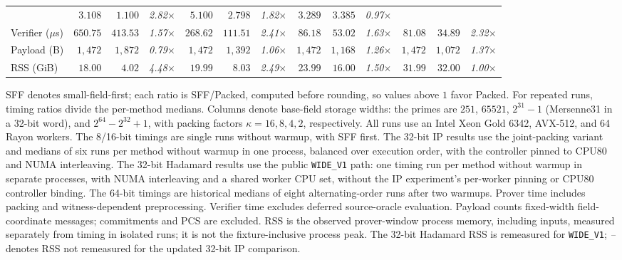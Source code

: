 \begin{table}[!t]
\begin{threeparttable}
\begin{tabular*}{\textwidth}{@{\extracolsep{\fill}}lrrrrrrrrrrrr@{}}
  & $3.108$ & $1.100$ & \textcolor{black!80}{\textit{2.82}\(\times\)}
  & $5.100$ & $2.798$ & \textcolor{black!80}{\textit{1.82}\(\times\)}
  & $3.289$ & $3.385$ & \textcolor{black!80}{\textit{0.97}\(\times\)} \\
Verifier ($\mu$s)
  & $650.75$ & $413.53$ & \textcolor{black!80}{\textit{1.57}\(\times\)}
  & $268.62$ & $111.51$ & \textcolor{black!80}{\textit{2.41}\(\times\)}
  & $86.18$ & $53.02$ & \textcolor{black!80}{\textit{1.63}\(\times\)}
  & $81.08$ & $34.89$ & \textcolor{black!80}{\textit{2.32}\(\times\)} \\
Payload (B)
  & $1{,}472$ & $1{,}872$ & \textcolor{black!80}{\textit{0.79}\(\times\)}
  & $1{,}472$ & $1{,}392$ & \textcolor{black!80}{\textit{1.06}\(\times\)}
  & $1{,}472$ & $1{,}168$ & \textcolor{black!80}{\textit{1.26}\(\times\)}
  & $1{,}472$ & $1{,}072$ & \textcolor{black!80}{\textit{1.37}\(\times\)} \\
RSS (GiB)
  & $18.00$ & $4.02$ & \textcolor{black!80}{\textit{4.48}\(\times\)}
  & $19.99$ & $8.03$ & \textcolor{black!80}{\textit{2.49}\(\times\)}
  & $23.99$ & $16.00$ & \textcolor{black!80}{\textit{1.50}\(\times\)}
  & $31.99$ & $32.00$ & \textcolor{black!80}{\textit{1.00}\(\times\)} \\
\bottomrule
\end{tabular*}
\small
\begin{tablenotes}
\item SFF denotes small-field-first; each ratio is SFF/Packed, computed
before rounding, so values above \(1\) favor Packed. For repeated runs,
timing ratios divide the per-method medians.
Columns denote base-field storage widths: the primes are \(251\),
\(65521\), \(2^{31}-1\) (Mersenne31 in a 32-bit word), and
\(2^{64}-2^{32}+1\), with packing factors \(\kappa=16,8,4,2\),
respectively.
All runs use an Intel Xeon Gold 6342, AVX-512, and 64 Rayon workers.
The 8/16-bit timings are single runs without warmup, with SFF first.
The 32-bit IP results use the joint-packing variant and medians of six
runs per method without warmup in one process, balanced over execution
order, with the controller pinned to CPU80 and NUMA interleaving.
The 32-bit Hadamard results use the public \texttt{WIDE\_V1} path:
one timing run per method without warmup in separate processes,
with NUMA interleaving and a shared worker CPU set, without the IP
experiment's per-worker pinning or CPU80 controller binding.
The 64-bit timings are historical medians of eight alternating-order
runs after two warmups.
Prover time includes packing and witness-dependent preprocessing.
Verifier time excludes deferred source-oracle evaluation.
Payload counts fixed-width field-coordinate messages; commitments
and PCS are excluded.
RSS is the observed prover-window process memory, including inputs,
measured separately from timing in isolated runs; it is not the
fixture-inclusive process peak. The 32-bit Hadamard RSS is remeasured
for \texttt{WIDE\_V1}; \textit{--} denotes RSS not remeasured for the
updated 32-bit IP comparison.
\end{tablenotes}
\end{threeparttable}
\end{table}
